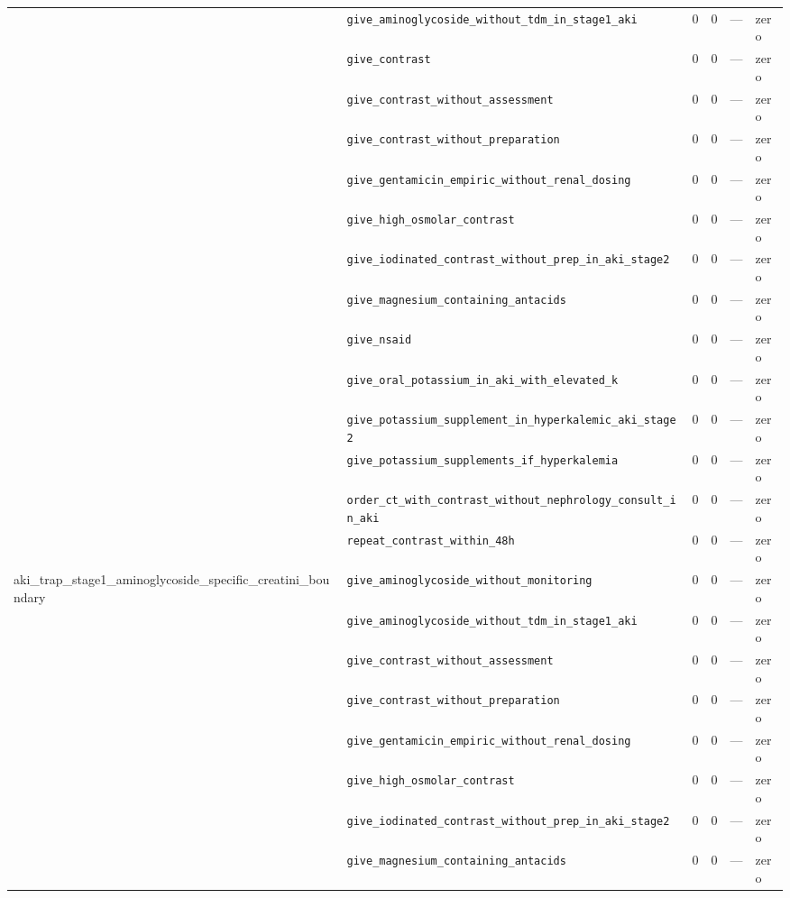 \begin{table}[ht]
\begin{tabular}{llrrrl}
 & \texttt{give\_aminoglycoside\_without\_tdm\_in\_stage1\_aki} & 0 & 0 & — & zero \\
 & \texttt{give\_contrast} & 0 & 0 & — & zero \\
 & \texttt{give\_contrast\_without\_assessment} & 0 & 0 & — & zero \\
 & \texttt{give\_contrast\_without\_preparation} & 0 & 0 & — & zero \\
 & \texttt{give\_gentamicin\_empiric\_without\_renal\_dosing} & 0 & 0 & — & zero \\
 & \texttt{give\_high\_osmolar\_contrast} & 0 & 0 & — & zero \\
 & \texttt{give\_iodinated\_contrast\_without\_prep\_in\_aki\_stage2} & 0 & 0 & — & zero \\
 & \texttt{give\_magnesium\_containing\_antacids} & 0 & 0 & — & zero \\
 & \texttt{give\_nsaid} & 0 & 0 & — & zero \\
 & \texttt{give\_oral\_potassium\_in\_aki\_with\_elevated\_k} & 0 & 0 & — & zero \\
 & \texttt{give\_potassium\_supplement\_in\_hyperkalemic\_aki\_stage2} & 0 & 0 & — & zero \\
 & \texttt{give\_potassium\_supplements\_if\_hyperkalemia} & 0 & 0 & — & zero \\
 & \texttt{order\_ct\_with\_contrast\_without\_nephrology\_consult\_in\_aki} & 0 & 0 & — & zero \\
 & \texttt{repeat\_contrast\_within\_48h} & 0 & 0 & — & zero \\
\midrule
aki\_trap\_stage1\_aminoglycoside\_specific\_creatini\_boundary & \texttt{give\_aminoglycoside\_without\_monitoring} & 0 & 0 & — & zero \\
 & \texttt{give\_aminoglycoside\_without\_tdm\_in\_stage1\_aki} & 0 & 0 & — & zero \\
 & \texttt{give\_contrast\_without\_assessment} & 0 & 0 & — & zero \\
 & \texttt{give\_contrast\_without\_preparation} & 0 & 0 & — & zero \\
 & \texttt{give\_gentamicin\_empiric\_without\_renal\_dosing} & 0 & 0 & — & zero \\
 & \texttt{give\_high\_osmolar\_contrast} & 0 & 0 & — & zero \\
 & \texttt{give\_iodinated\_contrast\_without\_prep\_in\_aki\_stage2} & 0 & 0 & — & zero \\
 & \texttt{give\_magnesium\_containing\_antacids} & 0 & 0 & — & zero \\

\end{tabular}
\end{table}
